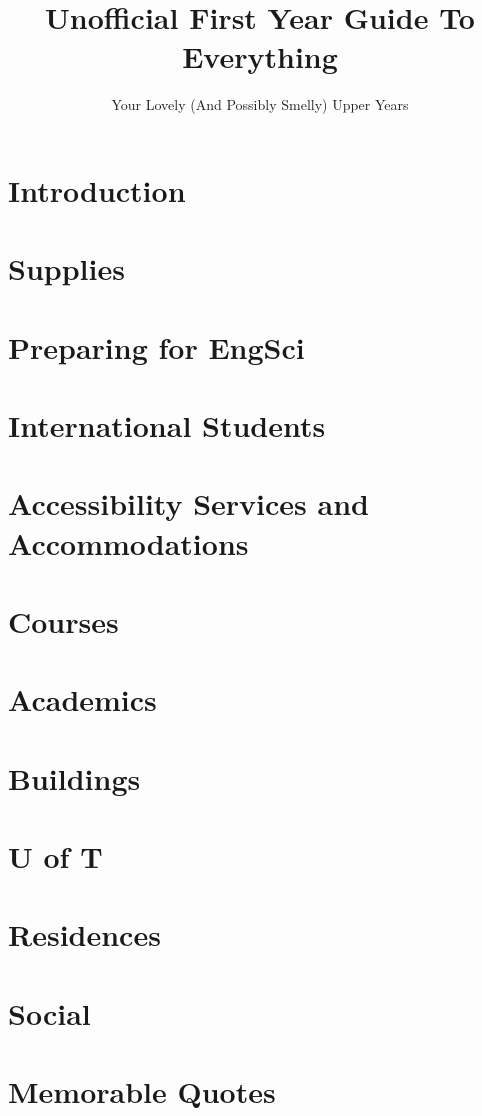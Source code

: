 \documentclass[12pt]{report}
\author{Your Lovely (And Possibly Smelly) Upper Years}
\title{Unofficial First Year Guide To Everything}
\begin{document}
\maketitle
\tableofcontents

\chapter{Introduction}

\chapter{Supplies}


\chapter{Preparing for EngSci}


\chapter{International Students}


\chapter{Accessibility Services and Accommodations}


\chapter{Courses}


\chapter{Academics}


\chapter{Buildings}


\chapter{U of T}


\chapter{Residences}


\chapter{Social}


\chapter{Memorable Quotes}

\end{document}
